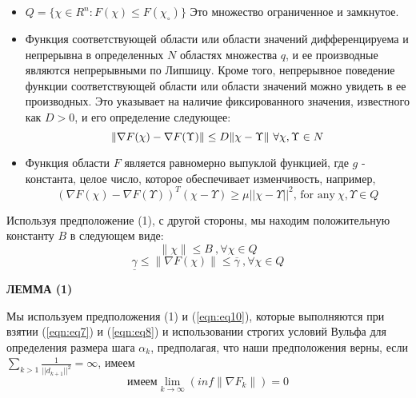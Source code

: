 \begin{itemize}
    \item $Q=\{\chi\in R^{n}\colon F(\chi)\leq F(\chi_{\circ})\}$ Это
    множество ограниченное и замкнутое.
    \item Функция соответствующей области или области значений дифференцируема и
    непрерывна в определенных $N$ областях множества $q$, и ее производные
    являются непрерывными по Липшицу. Кроме того, непрерывное поведение функции
    соответствующей области или области значений можно увидеть в ее производных.
    Это указывает на наличие фиксированного значения, известного как $D > 0$, и
    его определение следующее:
    \begin{equation*}
        \|\nabla F(\chi)-{\cal \nabla}F(\Upsilon)\|\leq D\|\chi-\Upsilon\|\ \forall\chi,\Upsilon\in N
    \end{equation*}
    \item Функция области $F$ является равномерно выпуклой функцией, где $g$ -
    константа, целое число, которое обеспечивает изменчивость, например,
    \begin{equation*}
        \left(\nabla F(\chi)-\nabla F(\Upsilon)\right)^{T}(\chi-\Upsilon)\geq\mu||\chi-\Upsilon||^{2} \text{, for any} \ \chi,\Upsilon\in Q
    \end{equation*}
\end{itemize}

\noindent Используя предположение (1), с другой стороны, мы находим
положительную константу $B$ в следующем виде:
\begin{equation*}
    \|\chi\|\leq B\ ,\forall\chi\in Q
\end{equation*}
\begin{equation}\label{eqn:eq10}
    \underline{{{\gamma}}}\leq\|\nabla F(\chi)\|\leq\overline{{{\gamma}}}\ ,\forall\chi\in Q
\end{equation}

\noindent \textbf{ЛЕММА (1)}

Мы используем предположения (1) и (\ref{eqn:eq10}), которые выполняются при
взятии (\ref{eqn:eq7}) и (\ref{eqn:eq8}) и использовании строгих условий Вульфа
для определения размера шага $\alpha_{k}$, предполагая, что наши
предположения верны, если
$\textstyle\sum_{k>1}{\frac{1}{||d_{k+1}||^{2}}}=\infty$, имеем
\begin{equation*}
    \text{имеем} \lim_{k \rightarrow \infty}\left(i n f\lVert\nabla F_{k}\rVert\right)=0
\end{equation*}

